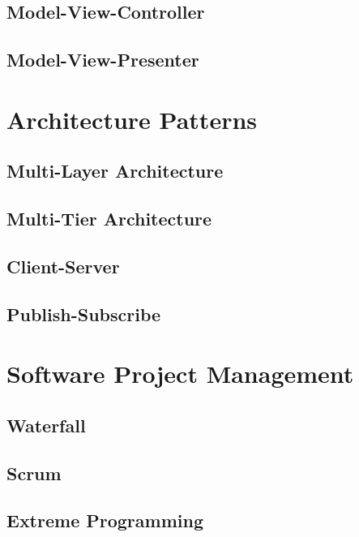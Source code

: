 \subsection{Model-View-Controller}
\subsection{Model-View-Presenter}

\section{Architecture Patterns}
\subsection{Multi-Layer Architecture}
\subsection{Multi-Tier Architecture}
\subsection{Client-Server}
\subsection{Publish-Subscribe}

\section{Software Project Management}
\subsection{Waterfall}
\subsection{Scrum}
\subsection{Extreme Programming}
\newpage
